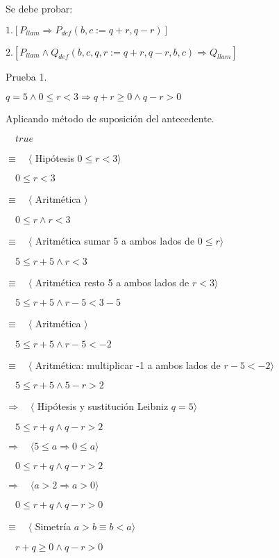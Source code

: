 \documentclass[hidelinks]{article}
\begin{document}
Se debe probar: \par

$1. [P_{llam} \Rightarrow P_{def}(b,c := q+r, q-r)]$ \par

$2. [P_{llam} \land Q_{def}(b,c,q,r := q+r,q-r, b, c) \Rightarrow Q_{llam}]$ \par

Prueba 1. \par

$q=5 \land 0 \leq r < 3 \Rightarrow q+r \geq 0 \land q-r > 0$ \par

Aplicando método de suposición del antecedente. \par

$\quad true$ \par
$\equiv \quad \langle$ Hipótesis $ 0 \leq r < 3 \rangle$ \par
$\quad 0 \leq r < 3$ \par
$\equiv \quad \langle$ Aritmética $ \rangle$ \par
$\quad 0 \leq r \land r < 3$ \par
$\equiv \quad \langle$ Aritmética sumar 5 a ambos lados de $ 0 \leq r \rangle$ \par
$\quad 5 \leq r +5 \land r < 3$ \par
$\equiv \quad \langle$ Aritmética resto 5 a ambos lados de $ r < 3 \rangle$ \par
$\quad 5 \leq r +5 \land r - 5 < 3 - 5$ \par
$\equiv \quad \langle$ Aritmética $ \rangle$ \par
$\quad 5 \leq r +5 \land r - 5 < -2$ \par
$\equiv \quad \langle$ Aritmética: multiplicar -1 a ambos lados de $r - 5 < -2 \rangle$ \par
$\quad 5 \leq r +5 \land 5 - r > 2$ \par
$\Rightarrow \quad \langle$ Hipótesis y sustitución Leibniz $ q = 5 \rangle$ \par
$\quad 5 \leq r + q \land q - r > 2$ \par
$\Rightarrow \quad \langle 5 \leq a \Rightarrow 0 \leq a \rangle$ \par
$\quad 0 \leq r + q \land q - r > 2$ \par
$\Rightarrow \quad \langle a > 2 \Rightarrow a > 0 \rangle$ \par
$\quad 0 \leq r + q \land q - r > 0$ \par
$\equiv \quad \langle$ Simetría $ a > b \equiv b < a \rangle$ \par
$\quad r + q \geq 0 \land q - r > 0$ \par
\end{document}
